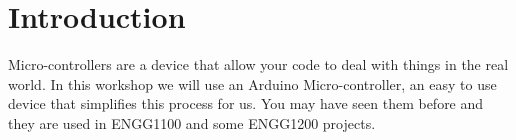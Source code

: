 \section{Introduction}
Micro-controllers are a device that allow your code to deal with things in the real world. In this workshop we will use an Arduino Micro-controller, an easy to use device that simplifies this process for us. You may have seen them before and they are used in ENGG1100 and some ENGG1200 projects.\\


\newpage